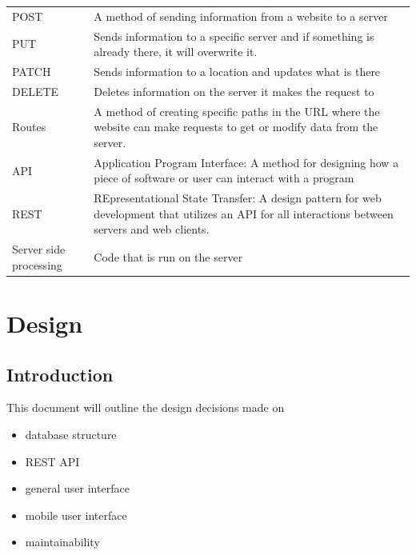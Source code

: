 \documentclass[draftclsnofoot,onecolumn,letterpaper,10pt]{IEEEtran}
\begin{document}
\begin{longtable}{p{4cm}p{12cm}}
    POST & A method of sending information from a website to a server \\
    PUT & Sends information to a specific server and if something is already there, it will overwrite it. \\
    PATCH & Sends information to a location and updates what is there \\
    DELETE & Deletes information on the server it makes the request to \\
    Routes & A method of creating specific paths in the URL where the website can make requests to get or modify data from the server. \\
    API & Application Program Interface: A method for designing how a piece of software or user can interact with a program \\
    REST & REpresentational State Transfer: A design pattern for web development that utilizes an API for all interactions between servers and web clients. \\
    Server side processing & Code that is run on the server \\
\end{longtable}

\section{Design}
	\subsection{Introduction}
	This document will outline the design decisions made on
	\begin{itemize}
		\item database structure
		\item REST API
		\item general user interface
		\item mobile user interface
		\item maintainability
	\end{itemize}
\end{document}
